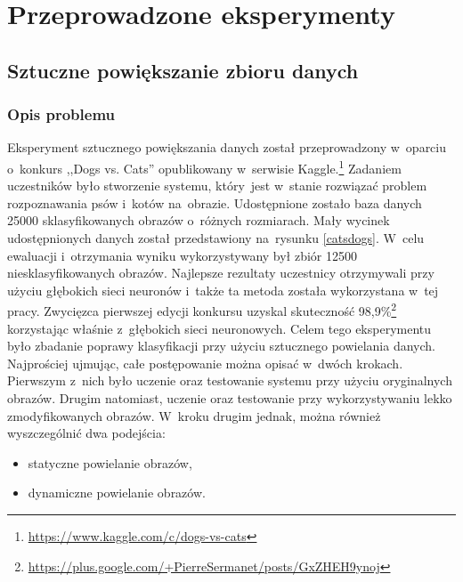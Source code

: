 \section{Przeprowadzone eksperymenty} \label{results}


\subsection{Sztuczne powiększanie zbioru danych}
\subsubsection{Opis problemu}
Eksperyment sztucznego powiększania danych został przeprowadzony w~oparciu o~konkurs ,,Dogs vs. Cats'' opublikowany w~serwisie Kaggle.\footnote{\label{myfootnote1}\url{https://www.kaggle.com/c/dogs-vs-cats}} Zadaniem uczestników było stworzenie systemu, który~jest w~stanie rozwiązać problem rozpoznawania psów i~kotów na~obrazie. Udostępnione zostało baza danych 25000 sklasyfikowanych obrazów o~różnych rozmiarach. Mały wycinek udostępnionych danych został przedstawiony na~rysunku \ref{catsdogs}. W~celu ewaluacji i~otrzymania wyniku wykorzystywany był zbiór 12500 niesklasyfikowanych obrazów. Najlepsze rezultaty uczestnicy otrzymywali przy użyciu głębokich sieci neuronów i~także ta metoda została wykorzystana w~tej pracy. Zwycięzca pierwszej edycji konkursu uzyskal skuteczność 98,9\%\footnote{\label{myfootnote2}\url{https://plus.google.com/+PierreSermanet/posts/GxZHEH9ynoj}} korzystając właśnie z~głębokich sieci neuronowych. Celem tego eksperymentu było zbadanie poprawy klasyfikacji przy użyciu sztucznego powielania danych. Najprościej ujmując, całe postępowanie można opisać w~dwóch krokach. Pierwszym z~nich było uczenie oraz testowanie systemu przy użyciu oryginalnych obrazów. Drugim natomiast, uczenie oraz testowanie przy wykorzystywaniu lekko zmodyfikowanych obrazów. W~kroku drugim jednak, można również wyszczególnić dwa podejścia:
\begin{itemize}
\item statyczne powielanie obrazów,
\item dynamiczne powielanie obrazów.
\end{itemize}

